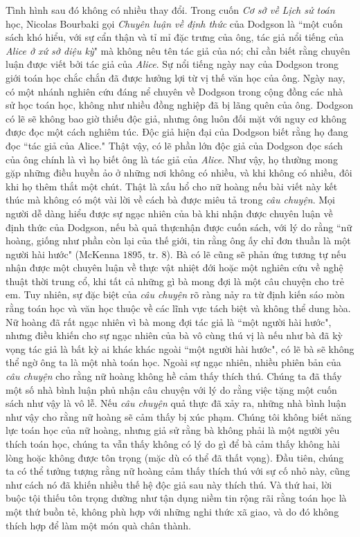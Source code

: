 \begin{multicols}{2}
	Tình hình sau đó không có nhiều thay đổi. Trong cuốn \textit{Cơ sở về Lịch sử toán} học, Nicolas Bourbaki gọi \textit{Chuyên luận về định thức} của Dodgson  là  ``một cuốn sách khó hiểu, với sự cẩn thận và tỉ mỉ đặc trưng của ông,  tác giả nổi tiếng của \textit{Alice ở xứ sở diệu kỳ}"  mà không nêu tên tác giả của nó; chỉ cần biết rằng chuyên luận được viết bởi tác giả của \textit{Alice}. Sự nổi tiếng ngày nay của Dodgson trong giới toán học chắc chắn đã được hưởng lợi từ vị thế văn học của ông. Ngày nay, có một nhánh nghiên cứu đáng nể chuyên về Dodgson trong cộng đồng các nhà sử học toán học, không như nhiều đồng nghiệp đã bị lãng quên của ông. Dodgson có lẽ sẽ không bao giờ thiếu độc giả, nhưng ông luôn đối mặt với nguy cơ không được đọc một cách nghiêm túc. Độc giả hiện đại của Dodgson biết rằng họ đang đọc ``tác giả của Alice." Thật vậy, có lẽ  phần lớn độc giả của Dodgson đọc sách của ông chính là vì họ biết ông là tác giả của \textit{Alice}. Như vậy, họ thường mong gặp những điều huyền ảo ở những nơi không có nhiều, và khi không có nhiều, đôi khi họ thêm thắt một chút.
	\vskip 0.1cm
	Thật là xấu hổ cho nữ hoàng nếu bài viết này kết thúc mà không có một vài lời về cách bà được miêu tả trong \textit{câu chuyện}. Mọi người dễ dàng hiểu được sự ngạc nhiên của bà khi nhận được chuyên luận về định thức của Dodgson, nếu bà quả thựcnhận được cuốn sách, với lý do rằng ``nữ hoàng, giống như phần còn lại của thế giới,  tin rằng ông ấy chỉ đơn thuần là một người hài hước" (McKenna $1895$, tr. $8$). Bà có lẽ cũng sẽ phản ứng tương tự nếu nhận được một chuyên luận về thực vật nhiệt đới hoặc một nghiên cứu về nghệ thuật thời trung cổ, khi tất cả những gì bà mong đợi là một câu chuyện cho trẻ em. Tuy nhiên, sự đặc biệt của \textit{câu chuyện} rõ ràng nảy ra từ định kiến sáo mòn rằng toán học và văn học thuộc về các lĩnh vực tách biệt và không thể dung hòa. Nữ hoàng đã rất ngạc nhiên vì bà mong đợi tác giả là ``một người hài hước", nhưng điều khiến cho sự ngạc nhiên của bà vô cùng thú vị là nếu như bà đã kỳ vọng tác giả là bất kỳ ai khác khác ngoài ``một người hài hước", có lẽ bà sẽ không thể ngờ ông ta là một nhà toán học.
	\vskip 0.1cm
	Ngoài sự ngạc nhiên, nhiều phiên bản của \textit{câu chuyện} cho rằng nữ hoàng không hề cảm thấy thích thú. Chúng ta đã thấy một số nhà bình luận phủ nhận câu chuyện với lý do rằng việc tặng một cuốn sách như vậy là vô lễ. Nếu \textit{câu chuyện} quả thực đã xảy ra, những nhà bình luận như vậy cho rằng nữ hoàng sẽ cảm thấy bị xúc phạm. Chúng tôi không biết năng lực toán học của nữ hoàng, nhưng giả sử rằng bà không phải là một người yêu thích toán học, chúng ta vẫn thấy không có lý do gì để bà cảm thấy không hài lòng hoặc không được tôn trọng (mặc dù có thể đã thất vọng). Đầu tiên, chúng ta có thể tưởng tượng rằng nữ hoàng cảm thấy thích thú với sự cố nhỏ này, cũng như cách nó đã khiến nhiều thế hệ độc giả sau này thích thú. Và thứ hai, lời buộc tội  thiếu tôn trọng dường như tận dụng niềm tin rộng rãi rằng toán học là một thứ buồn tẻ, không phù hợp với những nghi thức xã giao, và do đó không thích hợp để làm  một món quà chân thành.

\end{multicols}
